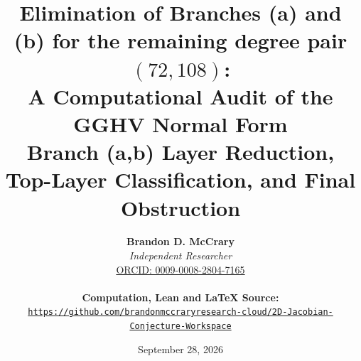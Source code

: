 \documentclass[a4paper,11pt]{article}
\theoremstyle{plain}
\theoremstyle{definition}
\theoremstyle{remark}
\begin{document}
\title{\textbf{\Large Elimination of Branches (a) and (b) for the remaining degree pair $(72,108)$:}\\[0.6em]
\large A Computational Audit of the GGHV Normal Form\\[0.4em]
\normalsize Branch (a,b) Layer Reduction, Top-Layer Classification, and Final Obstruction}
\author{\textbf{Brandon D. McCrary}\\[0.25em]
\textit{Independent Researcher}\\[0.25em]
\href{https://orcid.org/0009-0008-2804-7165}{ORCID: 0009-0008-2804-7165}\\[0.6em]
{\small \parbox{0.92\textwidth}{\centering \textbf{Computation, Lean and LaTeX Source:}\\
{\color{neonmagenta}\hypersetup{urlcolor=neonmagenta}\href{https://github.com/brandonmccraryresearch-cloud/2D-Jacobian-Conjecture-Workspace}{\nolinkurl{https://github.com/brandonmccraryresearch-cloud/2D-Jacobian-Conjecture-Workspace}}}}}}
\date{September 28, 2026}
\maketitle
\end{document}
